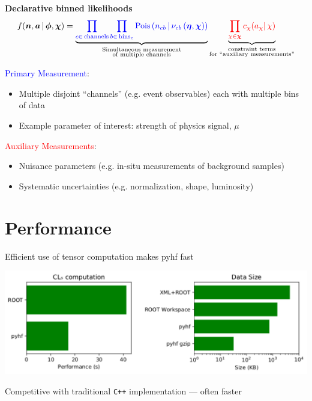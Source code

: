 \documentclass[a0paper,fleqn]{betterposter}
\begin{document}
{ \textbf{Declarative binned likelihoods}
 \vspace{1em}
 \[
  f(\bm{n}, \bm{a} \,|\,\bm{\phi},\bm{\chi}) = \underbrace{\color{blue}{\prod_{c\in\mathrm{\,channels}} \prod_{b \in \mathrm{\,bins}_c}\textrm{Pois}\left(n_{cb} \,\middle|\, \nu_{cb}\left(\bm{\eta},\bm{\chi}\right)\right)}}_{\substack{\text{Simultaneous measurement}\\%
    \text{of multiple channels}}} \underbrace{\color{red}{\prod_{\chi \in \bm{\chi}} c_{\chi}(a_{\chi} |\, \chi)}}_{\substack{\text{constraint terms}\\%
    \text{for }\text{``auxiliary measurements''}}}
 \]
 \vspace{1em}

 \textcolor{blue}{Primary Measurement}:
 \begin{itemize}
  \item Multiple disjoint ``channels'' (e.g. event observables) each with multiple bins of data
  \item Example parameter of interest: strength of physics signal, $\mu$
 \end{itemize}
 \textcolor{red}{Auxiliary Measurements}:
 \begin{itemize}
  \item Nuisance parameters (e.g. in-situ measurements of background samples)
  \item Systematic uncertainties (e.g. normalization, shape, luminosity)
 \end{itemize}

 \vfill
 \section{Performance}
 Efficient use of tensor computation makes pyhf fast
 \begin{center}
  \includegraphics[width=\textwidth]{performance_only.pdf}
 \end{center}
 Competitive with traditional \texttt{C++} implementation --- often faster
 \vfill
}
\end{document}
